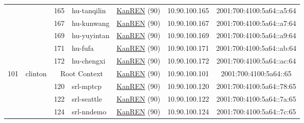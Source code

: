 \begin{small}
\begin{center}
\begin{longtable}{|c|c|c|c|c|c|c|c|}
  &  & \tiny{165} & \multicolumn{1}{|l|}{\tiny{hu-tanqilin}} & \multicolumn{2}{|c|}{\tiny{\href{http://www.kanren.net}{KanREN} (90)}} & \tiny{10.90.100.165} & \tiny{2001:700:4100:5a64::a5:64} \\* \cline{3-3}\cline{4-4}\cline{5-5}\cline{6-6}\cline{7-7}\cline{8-8}
  &  & \tiny{167} & \multicolumn{1}{|l|}{\tiny{hu-kunwang}} & \multicolumn{2}{|c|}{\tiny{\href{http://www.kanren.net}{KanREN} (90)}} & \tiny{10.90.100.167} & \tiny{2001:700:4100:5a64::a7:64} \\* \cline{3-3}\cline{4-4}\cline{5-5}\cline{6-6}\cline{7-7}\cline{8-8}
  &  & \tiny{169} & \multicolumn{1}{|l|}{\tiny{hu-yuyintan}} & \multicolumn{2}{|c|}{\tiny{\href{http://www.kanren.net}{KanREN} (90)}} & \tiny{10.90.100.169} & \tiny{2001:700:4100:5a64::a9:64} \\* \cline{3-3}\cline{4-4}\cline{5-5}\cline{6-6}\cline{7-7}\cline{8-8}
  &  & \tiny{171} & \multicolumn{1}{|l|}{\tiny{hu-fufa}} & \multicolumn{2}{|c|}{\tiny{\href{http://www.kanren.net}{KanREN} (90)}} & \tiny{10.90.100.171} & \tiny{2001:700:4100:5a64::ab:64} \\* \cline{3-3}\cline{4-4}\cline{5-5}\cline{6-6}\cline{7-7}\cline{8-8}
  &  & \tiny{172} & \multicolumn{1}{|l|}{\tiny{hu-chengxi}} & \multicolumn{2}{|c|}{\tiny{\href{http://www.kanren.net}{KanREN} (90)}} & \tiny{10.90.100.172} & \tiny{2001:700:4100:5a64::ac:64} \\ \hline
 \multirow{28}{*}{\tiny{101}} & \multicolumn{1}{|l|}{\multirow{28}{*}{\tiny{clinton}}} & \multicolumn{2}{|c|}{\tiny{Root Context}} & \multicolumn{2}{|c|}{\tiny{\href{http://www.kanren.net}{KanREN} (90)}} & \tiny{10.90.100.101} & \tiny{2001:700:4100:5a64::65} \\* \cline{3-3}\cline{4-4}\cline{5-5}\cline{6-6}\cline{7-7}\cline{8-8}
  &  & \tiny{120} & \multicolumn{1}{|l|}{\tiny{srl-mptcp}} & \multicolumn{2}{|c|}{\tiny{\href{http://www.kanren.net}{KanREN} (90)}} & \tiny{10.90.100.120} & \tiny{2001:700:4100:5a64::78:65} \\* \cline{3-3}\cline{4-4}\cline{5-5}\cline{6-6}\cline{7-7}\cline{8-8}
  &  & \tiny{122} & \multicolumn{1}{|l|}{\tiny{srl-seattle}} & \multicolumn{2}{|c|}{\tiny{\href{http://www.kanren.net}{KanREN} (90)}} & \tiny{10.90.100.122} & \tiny{2001:700:4100:5a64::7a:65} \\* \cline{3-3}\cline{4-4}\cline{5-5}\cline{6-6}\cline{7-7}\cline{8-8}
  &  & \tiny{124} & \multicolumn{1}{|l|}{\tiny{srl-nndemo}} & \multicolumn{2}{|c|}{\tiny{\href{http://www.kanren.net}{KanREN} (90)}} & \tiny{10.90.100.124} & \tiny{2001:700:4100:5a64::7c:65} \\* \cline{3-3}\cline{4-4}\cline{5-5}\cline{6-6}\cline{7-7}\cline{8-8}

\end{longtable}
\end{center}
\end{small}
